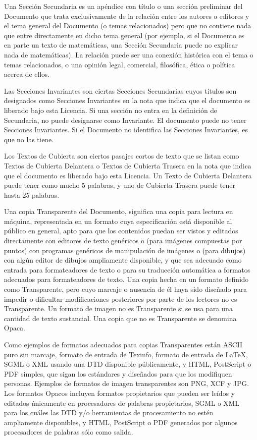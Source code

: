 \documentclass[a4paper, 11pt, oneside]{report}
\begin{document}
Una Sección Secundaria es un apéndice con título o una sección preliminar del Documento que trata exclusivamente de la relación entre los autores o editores y el tema general del Documento (o temas relacionados) pero que no contiene nada que entre directamente en dicho tema general (por ejemplo, si el Documento es en parte un texto de matemáticas, una Sección Secundaria puede no explicar nada de matemáticas). La relación puede ser una conexión histórica con el tema o temas relacionados, o una opinión legal, comercial, filosófica, ética o política acerca de ellos.

Las Secciones Invariantes son ciertas Secciones Secundarias cuyos títulos son designados como Secciones Invariantes en la nota que indica que el documento es liberado bajo esta Licencia. Si una sección no entra en la definición de Secundaria, no puede designarse como Invariante. El documento puede no tener Secciones Invariantes. Si el Documento no identifica las Secciones Invariantes, es que no las tiene.

Los Textos de Cubierta son ciertos pasajes cortos de texto que se listan como Textos de Cubierta Delantera o Textos de Cubierta Trasera en la nota que indica que el documento es liberado bajo esta Licencia. Un Texto de Cubierta Delantera puede tener como mucho 5 palabras, y uno de Cubierta Trasera puede tener hasta 25 palabras.

Una copia Transparente del Documento, significa una copia para lectura en máquina, representada en un formato cuya especificación está disponible al público en general, apto para que los contenidos puedan ser vistos y editados directamente con editores de texto genéricos o (para imágenes compuestas por puntos) con programas genéricos de manipulación de imágenes o (para dibujos) con algún editor de dibujos ampliamente disponible, y que sea adecuado como entrada para formateadores de texto o para su traducción automática a formatos adecuados para formateadores de texto. Una copia hecha en un formato definido como Transparente, pero cuyo marcaje o ausencia de él haya sido diseñado para impedir o dificultar modificaciones posteriores por parte de los lectores no es Transparente. Un formato de imagen no es Transparente si se usa para una cantidad de texto sustancial. Una copia que no es Transparente se denomina Opaca.

Como ejemplos de formatos adecuados para copias Transparentes están ASCII puro sin marcaje, formato de entrada de Texinfo, formato de entrada de LaTeX, SGML o XML usando una DTD disponible públicamente, y HTML, PostScript o PDF simples, que sigan los estándares y diseñados para que los modifiquen personas. Ejemplos de formatos de imagen transparentes son PNG, XCF y JPG. Los formatos Opacos incluyen formatos propietarios que pueden ser leídos y editados únicamente en procesadores de palabras propietarios, SGML o XML para los cuáles las DTD y/o herramientas de procesamiento no estén ampliamente disponibles, y HTML, PostScript o PDF generados por algunos procesadores de palabras sólo como salida.
\end{document}
